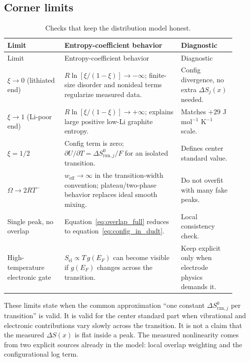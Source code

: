 \documentclass[11pt,a4paper]{article}
\newcommand{\rxn}{\mathrm{rxn}}
\newcommand{\el}{\mathrm{el}}
\newcommand{\eff}{\mathrm{eff}}
\begin{document}
\subsection{Corner limits}
\begin{longtable}{p{0.23\linewidth} p{0.47\linewidth} p{0.22\linewidth}}
\caption{Checks that keep the distribution model honest.}
\label{tab:limits}\\
\toprule
Limit & Entropy-coefficient behavior & Diagnostic\\
\midrule
\endfirsthead
\toprule
Limit & Entropy-coefficient behavior & Diagnostic\\
\midrule
\endhead
$\xi\to0$ (lithiated end) &
$R\ln[\xi/(1-\xi)]\to-\infty$; finite-size disorder and nonideal terms regularize measured data. &
Config divergence, no extra $\Delta S_j(x)$ needed.\\
$\xi\to1$ (Li-poor end) &
$R\ln[\xi/(1-\xi)]\to+\infty$; explains large positive low-Li graphite entropy. &
Matches $+29$ J mol$^{-1}$ K$^{-1}$ scale.\\
$\xi=1/2$ &
Config term is zero; $\partial U/\partial T=\Delta S^0_{\rxn,j}/F$ for an isolated transition. &
Defines center standard value.\\
$\Omega\to2RT^-$ &
$w_\eff\to\infty$ in the transition-width convention; plateau/two-phase behavior replaces ideal smooth mixing. &
Do not overfit with many fake peaks.\\
Single peak, no overlap &
Equation~\eqref{eq:overlap_full} reduces to equation~\eqref{eq:config_in_dudt}. &
Local consistency check.\\
High-temperature electronic gate &
$S_\el\propto T\,g(E_F)$ can become visible if $g(E_F)$ changes across the transition. &
Keep explicit only when electrode physics demands it.\\
\bottomrule
\end{longtable}

These limits state when the common approximation ``one constant $\Delta S^0_{\rxn,j}$ per
transition'' is valid. It is valid for the center standard part when vibrational and
electronic contributions vary slowly across the transition. It is not a claim that the
measured $\Delta S(x)$ is flat inside a peak. The measured nonlinearity comes from two
explicit sources already in the model: local overlap weighting and the configurational
log term.

\end{document}
